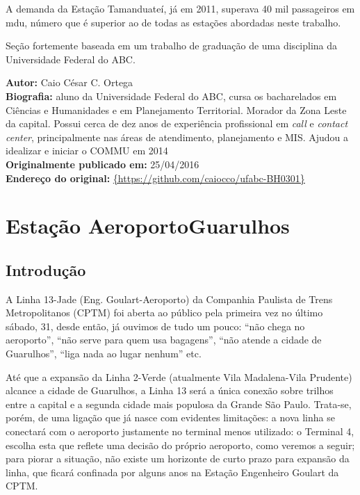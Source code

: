 \documentclass[11pt,fleqn]{book} %
\newcommand{\infocaio}[2]{\textbf{Autor:} Caio C\'{e}sar C. Ortega \\ \textbf{Biografia:} aluno da Universidade Federal do ABC, cursa os bacharelados em Ci\^{e}ncias e Humanidades e em Planejamento Territorial. Morador da Zona Leste da capital. Possui cerca de dez anos de experi\^{e}ncia profissional em \textit{call} e \textit{contact center}, principalmente nas \'{a}reas de atendimento, planejamento e MIS. Ajudou a idealizar e iniciar o COMMU em 2014 \\ \textbf{Originalmente publicado em:} {#1} \\ \textbf{Endere\c{c}o do original:} \url{{#2}}}
\begin{document}
A demanda da Estação Tamanduateí, já em 2011, superava 40 mil passageiros em \gls{mdu}, número que é superior ao de todas as estações abordadas neste trabalho.

\begin{center}
\end{center}

\begin{obs}
	Seção fortemente baseada em um trabalho de graduação de uma disciplina da Universidade Federal do ABC.
\end{obs}

\begin{info}
	\infocaio{25/04/2016}{https://github.com/caiocco/ufabc-BH0301}
\end{info}

\section{Estação Aeroporto\textperiodcentered Guarulhos}\label{s:agu}

\subsection{Introdução}

A Linha 13-Jade (Eng. Goulart-Aeroporto) da Companhia Paulista de Trens Metropolitanos (CPTM) foi aberta ao público pela primeira vez no último sábado, 31, desde então, já ouvimos de tudo um pouco: “não chega no aeroporto”, “não serve para quem usa bagagens”, “não atende a cidade de Guarulhos”, “liga nada ao lugar nenhum” etc.

Até que a expansão da Linha 2-Verde (atualmente Vila Madalena-Vila Prudente) alcance a cidade de Guarulhos, a Linha 13 será a única conexão sobre trilhos entre a capital e a segunda cidade mais populosa da Grande São Paulo. Trata-se, porém, de uma ligação que já nasce com evidentes limitações: a nova linha se conectará com o aeroporto justamente no terminal menos utilizado: o Terminal 4, escolha esta que reflete uma decisão do próprio aeroporto, como veremos a seguir; para piorar a situação, não existe um horizonte de curto prazo para expansão da linha, que ficará confinada por alguns anos na Estação Engenheiro Goulart da CPTM.
\end{document}
